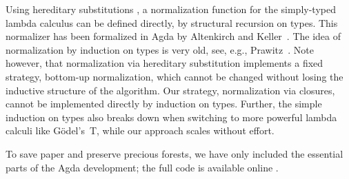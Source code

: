 \documentclass[preliminary,copyright,creativecommons]{eptcs}
\begin{document}
Using hereditary substitutions \cite{watkins:concurrentLFTR}, a
normalization function for the simply-typed lambda calculus can be
defined directly, by structural recursion on types.  This normalizer
has been formalized in Agda by Altenkirch and
Keller~\cite{kellerAltenkirch:msfp10}.  The idea of normalization by
induction on types is very old, see, e.g.,
Prawitz~\cite{prawitz:natDed}.  Note however, that normalization via
hereditary substitution implements a fixed strategy, bottom-up
normalization, which cannot be changed without losing the inductive
structure of the algorithm.  Our strategy, normalization via closures,
cannot be implemented directly by induction on types.  Further, the
simple induction on types also breaks down when switching to more
powerful lambda calculi like G\"odel's~T, while our approach scales
without effort.

To save paper and preserve precious forests,
we have only included the essential parts of the
Agda development; the full code is available online
\cite{abelChapman:msfp14lagda}.
\end{document}
